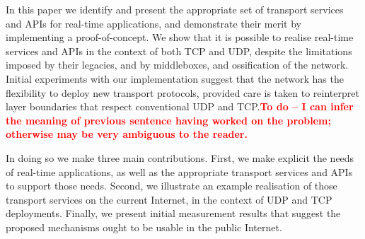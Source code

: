 \documentclass[10pt]{sig-alternate-05-2015}
\newcommand{\todo}[1]{\textbf{\textcolor{red}{To do -- #1}}}
\begin{document}

In this paper we identify and present the appropriate set of transport
services and APIs for real-time applications, and demonstrate their
merit by implementing a proof-of-concept. We show that it is possible
to realise real-time services and APIs in the context of both TCP and
UDP, despite the limitations imposed by their legacies, and by
middleboxes, and ossification of the network.  Initial experiments
with our implementation suggest that
the network has the flexibility to deploy new transport protocols,
provided care is taken to reinterpret layer boundaries that respect
conventional UDP and TCP.\todo{I can infer the meaning of previous sentence having worked on the problem; otherwise may be very ambiguous to the reader.}


In doing so we make three main contributions. First, we make explicit
the needs of real-time applications, as well as the appropriate
transport services and APIs to support those needs. Second, we
illustrate an example realisation of those transport services on the
current Internet, in the context of UDP and TCP deployments. Finally,
we present initial measurement results that suggest the proposed
mechanisms ought to be usable in the public Internet.

\end{document}
